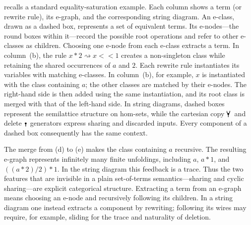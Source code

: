  recalls a standard equality-saturation example.
Each column shows a term (or rewrite rule), its e-graph, and the corresponding
string diagram.  An e-class, drawn as a dashed box, represents a set of
equivalent terms.  Its e-nodes---the round boxes within it---record the
possible root operations and refer to other e-classes as children.
Choosing one e-node from each e-class extracts a term.  In column~(b), the rule
$x*2\rightsquigarrow x\mathbin{<\!\!<}1$ creates a non-singleton class while
retaining the shared occurrences of $a$ and $2$.
Each rewrite rule instantiates its variables with matching e-classes.  In
column~(b), for example, $x$ is instantiated with the class containing $a$;
the other classes are matched by their e-nodes.  The right-hand side is then
added using the same instantiation, and its root class is merged with that of
the left-hand side.  In string diagrams, dashed boxes represent the
semilattice structure on hom-sets, while the cartesian copy $\comonoid$ and
delete $\counit$ generators express sharing and discarded inputs.  Every
component of a dashed box consequently has the same context.

The merge from (d) to (e) makes the class containing $a$ recursive.  The
resulting e-graph represents infinitely many finite unfoldings, including
$a$, $a*1$, and $((a*2)/2)*1$.  In the string diagram this feedback is a
trace.  Thus the two features that are invisible in a plain set-of-terms
semantics---sharing and cyclic sharing---are explicit categorical structure.
Extracting a term from an e-graph means choosing an e-node and recursively
following its children.  In a string diagram one instead extracts a component
by rewriting; following its wires may require, for example, sliding for the
trace and naturality of deletion.

